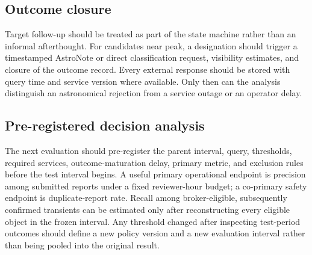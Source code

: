 \documentclass[11pt]{article}
\begin{document}
\subsection{Outcome closure}

Target follow-up should be treated as part of the state machine rather than an informal afterthought. For candidates near peak, a designation should trigger a timestamped AstroNote or direct classification request, visibility estimates, and closure of the outcome record. Every external response should be stored with query time and service version where available. Only then can the analysis distinguish an astronomical rejection from a service outage or an operator delay.

\subsection{Pre-registered decision analysis}

The next evaluation should pre-register the parent interval, query, thresholds, required services, outcome-maturation delay, primary metric, and exclusion rules before the test interval begins. A useful primary operational endpoint is precision among submitted reports under a fixed reviewer-hour budget; a co-primary safety endpoint is duplicate-report rate. Recall among broker-eligible, subsequently confirmed transients can be estimated only after reconstructing every eligible object in the frozen interval. Any threshold changed after inspecting test-period outcomes should define a new policy version and a new evaluation interval rather than being pooled into the original result.





\end{document}
